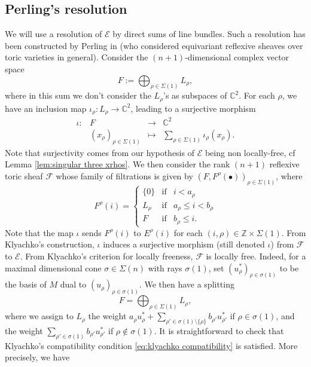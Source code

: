 \documentclass[a4paper,10pt]{amsart}
\theoremstyle{plain}{
    \newtheorem{theorem}{Theorem}[section]
    \newtheorem{lemma}[theorem]{Lemma}
    \newtheorem{corollary}[theorem]{Corollary}
    \newtheorem{proposition}[theorem]{Proposition}
    \newtheorem{conjecture}[theorem]{Conjecture}
}
\theoremstyle{definition}{
    \newtheorem{definition}[theorem]{Definition}
    \newtheorem{defn-thm}[theorem]{Definition-Theorem}
    \newtheorem{example}[theorem]{Example}
    \newtheorem{notation}[theorem]{Notation}
}
\theoremstyle{remark}{
    \newtheorem{remark}[theorem]{Remark}
    \newtheorem{problem}[theorem]{Problem}
    \newtheorem{question}[theorem]{Question}
}
\def\cF{\mathcal{F}}
\def\cE{\mathcal{E}}
\def\Z{\mathbb{Z}}
\def\C{\mathbb{C}}
\begin{document}
\subsection{Perling's resolution}
\label{sec:perling resolution}
We will use a resolution of $\cE$ by direct sums of line bundles. Such a resolution has been constructed by Perling in \cite[Chapters 5 and 6]{Per03} (who considered equivariant reflexive sheaves over toric varieties in general). Consider the $(n+1)$-dimensional complex vector space
$$
F:=\bigoplus_{\rho\in\Sigma(1)}L_\rho,
$$
where in this sum we don't consider the $L_\rho$'s as subspaces of $\C^2$. For each $\rho$, we have an inclusion map $\iota_\rho : L_\rho \to \C^2$, leading to a surjective morphism 
$$
\begin{array}{cccc}
 \iota : & F & \to & \C^2 \\
          & (x_\rho)_{\rho\in\Sigma(1)} & \mapsto & \displaystyle\sum_{\rho\in\Sigma(1)} \iota_\rho(x_\rho).
\end{array}
$$
Note that surjectivity comes from our hypothesis of $\cE$ being non locally-free, cf Lemma \ref{lem:singular three xrhos}. We then consider the rank $(n+1)$ reflexive toric sheaf $\cF$ whose family of filtrations is given by $(F,F^\rho(\bullet))_{\rho\in\Sigma(1)}$, where
$$
F^\rho(i)=\left\{
 \begin{array}{ccc}
                  \lbrace 0 \rbrace & \mathrm{ if } & i< a_\rho \\
                 L_\rho & \mathrm{ if } & a_\rho\leq i< b_\rho \\
F & \mathrm{ if } & b_\rho\leq i .
                  \end{array}
                  \right.
$$
Note that the map $\iota$ sends $F^\rho(i)$ to $E^\rho(i)$ for each $(i,\rho)\in \Z\times\Sigma(1)$. From Klyachko's construction, $\iota$ induces a surjective morphism (still denoted $\iota$) from $\cF$ to $\cE$.  From Klyachko's criterion for locally freeness, $\cF$ is locally free. Indeed, for a maximal dimensional cone $\sigma\in\Sigma(n)$ with rays $\sigma(1)$, set $(u_\rho^*)_{\rho\in\sigma(1)}$ to be the basis of $M$ dual to $(u_\rho)_{\rho\in\sigma(1)}$. We then have a  splitting
\[
 F=\bigoplus_{\rho\in\Sigma(1)}L_\rho,
\]
where we assign to $L_\rho$ the weight $a_\rho u_\rho^*+\sum_{\rho'\in\sigma(1)\setminus\lbrace\rho\rbrace} b_{\rho'} u_{\rho'}^*$ if $\rho\in\sigma(1)$, and the weight $\sum_{\rho'\in\sigma(1)} b_{\rho'} u_{\rho'}^*$ if $\rho\notin \sigma(1)$. It is straightforward to check that Klyachko's compatibility condition \eqref{eq:klyachko compatibility} is satisfied. More precisely, we have
\end{document}
